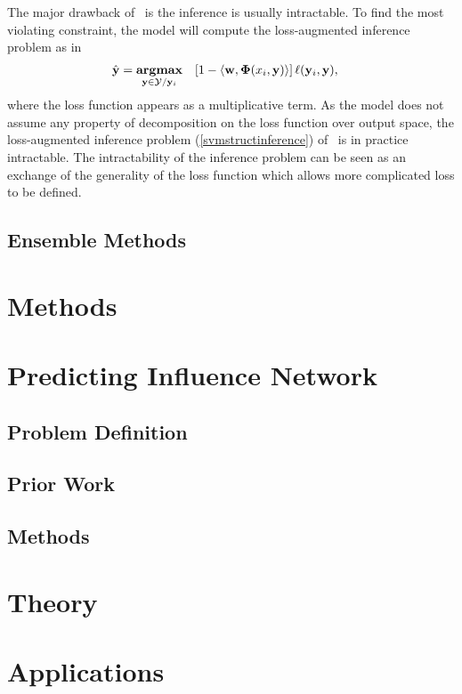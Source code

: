 The major drawback of \svmstruct\ is the inference is usually intractable.
To find the most violating constraint, the model will compute the loss-augmented inference problem as in \citep{TJTA05}
\begin{align}
	\hat{\mathbf {y}} = \underset{\mathbf {y}\in\mathcal{Y}/\mathbf {y}_i}{\textbf{argmax}} &\quad [1-\langle \mathbf {w}, \mathbf{\Phi}(x_i,\mathbf {y}) \rangle]\,\mathbf {\ell}(\mathbf {y}_i,\mathbf {y}) \label{svmstructinference},
\end{align}
where the loss function appears as a multiplicative term.
As the model does not assume any property of decomposition on the loss function over output space, the loss-augmented inference problem (\ref{svmstructinference}) of \svmstruct\ is in practice intractable. 
The intractability of the inference problem can be seen as an exchange of the generality of the loss function which allows more complicated loss to be defined. 




\section{Ensemble Methods}


\chapter{Methods}


\chapter{Predicting Influence Network}
\section{Problem Definition}
\section{Prior Work}
\section{Methods}



\chapter{Theory}


\chapter{Applications}


